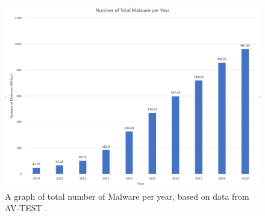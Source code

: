 \documentclass[pdf,bookmarks,colorlinks=true]{IEEEtran}
\begin{document}
\begin{figure}
	\centering
	\includegraphics[width=0.7\linewidth]{"Total Number Of Malware per Year"}
	\caption{A graph of total number of Malware per year, based on data from AV-TEST \cite{AVtest}.}
	\label{fig:total-number-of-malware-per-year}
\end{figure}
\end{document}
